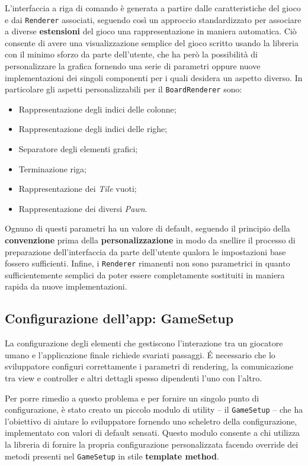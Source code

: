 L'interfaccia a riga di comando è generata a partire dalle caratteristiche del gioco e dai \texttt{Renderer} associati, seguendo così un approccio standardizzato per associare a diverse \textbf{estensioni} del gioco una rappresentazione in maniera automatica.
%
Ciò consente di avere una visualizzazione semplice del gioco scritto usando la libreria con il minimo sforzo da parte dell'utente, che ha però la possibilità di personalizzare la grafica fornendo una serie di parametri oppure nuove implementazioni dei singoli componenti per i quali desidera un aspetto diverso.
%
In particolare gli aspetti personalizzabili per il \texttt{BoardRenderer} sono:
\begin{itemize}
  \item Rappresentazione degli indici delle colonne;
  \item Rappresentazione degli indici delle righe;
  \item Separatore degli elementi grafici;
  \item Terminazione riga;
  \item Rappresentazione dei \textit{Tile} vuoti;
  \item Rappresentazione dei diversi \textit{Pawn}.
\end{itemize}
%
Ognuno di questi parametri ha un valore di default, seguendo il principio della \textbf{convenzione} prima della \textbf{personalizzazione} in modo da snellire il processo di preparazione dell'interfaccia da parte dell'utente qualora le impostazioni base fossero sufficienti.
%
Infine, i \texttt{Renderer} rimanenti non sono parametrici in quanto sufficientemente semplici da poter essere completamente sostituiti in maniera rapida da nuove implementazioni.


\subsection{Configurazione dell'app: GameSetup}

La configurazione degli elementi che gestiscono l'interazione tra un giocatore umano e l'applicazione finale richiede svariati passaggi.
%
\'E necessario che lo sviluppatore configuri correttamente i parametri di rendering, la comunicazione tra view e controller e altri dettagli spesso dipendenti l'uno con l'altro.

Per porre rimedio a questo problema e per fornire un singolo punto di configurazione, è stato creato un piccolo modulo di utility -- il \texttt{GameSetup} -- che ha l'obiettivo di aiutare lo sviluppatore fornendo uno scheletro della configurazione, implementato con valori di default sensati.
%
Questo modulo consente a chi utilizza la libreria di fornire la propria configurazione personalizzata facendo override dei metodi presenti nel \texttt{GameSetup} in stile \textbf{template method}.

